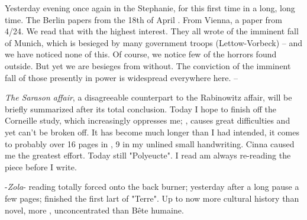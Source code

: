 
Yesterday evening once again in the Stephanie, for this first time in a long, long time. The Berlin papers from the 18th of April . From Vienna, a paper from 4/24. We read that with the highest interest. They all wrote of the imminent fall of Munich, which is besieged by many government troops (Lettow-Vorbeck) -- and we have noticed none of this. Of course, we notice few of the horrors found outside. But yet we are besieges from without. The conviction of the imminent fall of those presently in power is widespread everywhere here. -- 

\textit{The Sarason affair}, a disagreeable counterpart to the Rabinowitz affair, will be briefly summarized after its total conclusion. Today I hope to finish off the Corneille study, which increasingly oppresses me; , causes great difficulties and yet can't be broken off. It has become much longer than I had intended, it comes to probably over 16 pages in , 9 in my unlined small handwriting. Cinna caused me the greatest effort. Today still "Polyeucte". I read am always re-reading the piece before I write.

-\textit{Zola}- reading totally forced onto the back burner; yesterday after a long pause a few pages; finished the first lart of "Terre". Up to now more cultural history than novel, more , unconcentrated than Bête humaine.

